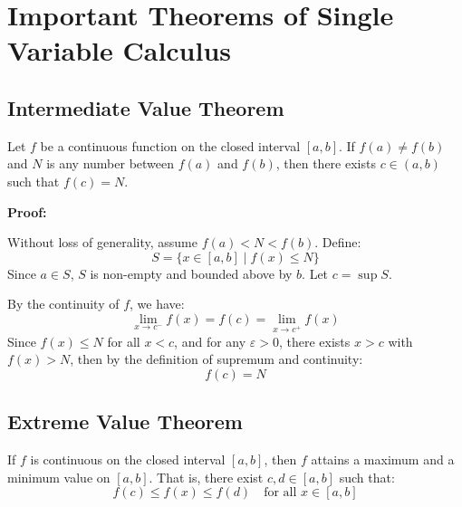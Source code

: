 \newpage
\section{Important Theorems of Single Variable Calculus}

\subsection{Intermediate Value Theorem}

Let \( f \) be a continuous function on the closed interval \([a, b]\). If \( f(a) \ne f(b) \) and \( N \) is any number between \( f(a) \) and \( f(b) \), then there exists \( c \in (a, b) \) such that \( f(c) = N \).

\textbf{Proof:}  

Without loss of generality, assume \( f(a) < N < f(b) \).  
Define:
\[
S = \{ x \in [a, b] \mid f(x) \le N \}
\]
Since \( a \in S \), \( S \) is non-empty and bounded above by \( b \). Let \( c = \sup S \).

By the continuity of \( f \), we have:
\[
\lim_{x \to c^-} f(x) = f(c) = \lim_{x \to c^+} f(x)
\]
Since \( f(x) \le N \) for all \( x < c \), and for any \( \varepsilon > 0 \), there exists \( x > c \) with \( f(x) > N \), then by the definition of supremum and continuity:
\[
f(c) = N
\]

\QED

\begin{center}
\end{center}

\subsection{Extreme Value Theorem}

If \( f \) is continuous on the closed interval \([a, b] \), then \( f \) attains a maximum and a minimum value on \([a, b]\).  
That is, there exist \( c, d \in [a, b] \) such that:
\[
f(c) \le f(x) \le f(d) \quad \text{for all } x \in [a, b]
\]

